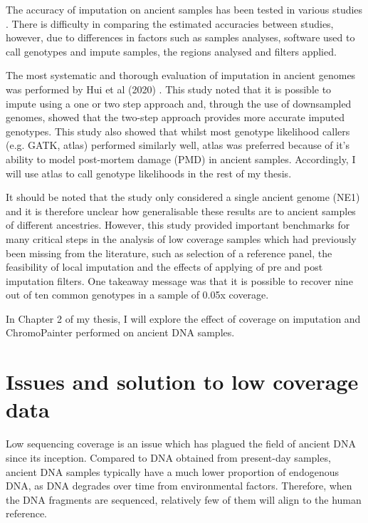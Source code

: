 The accuracy of imputation on ancient samples has been tested in various studies \cite{Martiniano2017, hui2020evaluating, EmpiricalAncient}. There is difficulty in comparing the estimated accuracies between studies, however, due to differences in factors such as samples analyses, software used to call genotypes and impute samples, the regions analysed and filters applied. 

The most systematic and thorough evaluation of imputation in ancient genomes was performed by Hui et al (2020) \cite{hui2020evaluating}. This study noted that it is possible to impute using a one or two step approach and, through the use of downsampled genomes, showed that the two-step approach provides more accurate imputed genotypes. This study also showed that whilst most genotype likelihood callers (e.g. GATK, atlas) performed similarly well, atlas was preferred because of it's ability to model post-mortem damage (PMD) in ancient samples. Accordingly, I will use atlas to call genotype likelihoods in the rest of my thesis. 

It should be noted that the study only considered a single ancient genome (NE1) and it is therefore unclear how generalisable these results are to ancient samples of different ancestries. However, this study provided important benchmarks for many critical steps in the analysis of low coverage samples which had previously been missing from the literature, such as selection of a reference panel, the feasibility of local imputation and the effects of applying of pre and post imputation filters. One takeaway message was that it is possible to recover nine out of ten common genotypes in a sample of 0.05x coverage. 

In Chapter 2 of my thesis, I will explore the effect of coverage on imputation and ChromoPainter performed on ancient DNA samples. 

\section{Issues and solution to low coverage data}

Low sequencing coverage is an issue which has plagued the field of ancient DNA since its inception. Compared to DNA obtained from present-day samples, ancient DNA samples typically have a much lower proportion of endogenous DNA, as DNA degrades over time from environmental factors. Therefore, when the DNA fragments are sequenced, relatively few of them will align to the human reference. 

